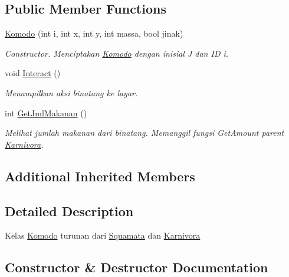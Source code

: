 \subsection*{Public Member Functions}
\begin{DoxyCompactItemize}
\item 
\hyperlink{classKomodo_ac2d7d7d36ba0cff779de2f39303554c2}{Komodo} (int i, int x, int y, int massa, bool jinak)
\begin{DoxyCompactList}\small\item\em Constructor. Menciptakan \hyperlink{classKomodo}{Komodo} dengan inisial \textquotesingle{}J\textquotesingle{} dan ID i. \end{DoxyCompactList}\item 
void \hyperlink{classKomodo_ab3b3b931d96321b809f6db8c04f2dc77}{Interact} ()\hypertarget{classKomodo_ab3b3b931d96321b809f6db8c04f2dc77}{}\label{classKomodo_ab3b3b931d96321b809f6db8c04f2dc77}

\begin{DoxyCompactList}\small\item\em Menampilkan aksi binatang ke layar. \end{DoxyCompactList}\item 
int \hyperlink{classKomodo_a308c3080f48dc07b8cf9374fd2aa9d0d}{Get\+Jml\+Makanan} ()
\begin{DoxyCompactList}\small\item\em Melihat jumlah makanan dari binatang. Memanggil fungsi Get\+Amount parent \hyperlink{classKarnivora}{Karnivora}. \end{DoxyCompactList}\end{DoxyCompactItemize}
\subsection*{Additional Inherited Members}


\subsection{Detailed Description}
Kelas \hyperlink{classKomodo}{Komodo} turunan dari \hyperlink{classSquamata}{Squamata} dan \hyperlink{classKarnivora}{Karnivora} 

\subsection{Constructor \& Destructor Documentation}
